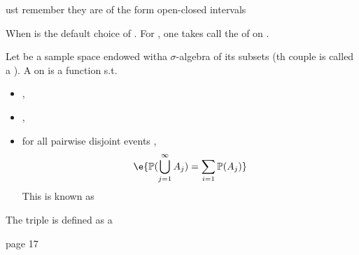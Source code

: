 \begin{D}
\begin{T}
\begin{D} The  of  is the generated $sigma$ algebra generated by :
$$\e{\mathcal{B}(\mathbb{R}^m):=\sigma\{\prod_{i=1}^m (a_i,b_i]:a_i,b_i\in\mathbb{R} , a_i<b_i\} }$$
\end{D}
\begin{R} ust remember they are of the form open-closed intervals \end{R}
When  is the default choice of .
For , one takes  call the  of  on \e{$\Omega$}.

\begin{D}
Let  be a sample space endowed witha $\sigma$-algebra of its subsets (th couple is called a  ). A  on   is a function  s.t.
\begin{itemize}
\item {},
\item {},
\item for all pairwise disjoint events ,
$$\e{\mathbb{P}(\bigcup_{j=1}^\infty A_j) = \sum_{i=1} \mathbb{P}(A_j)}$$
This is known as \end{itemize}
\end{D}

\begin{D} The triple  is defined as a  \end{D}
page 17